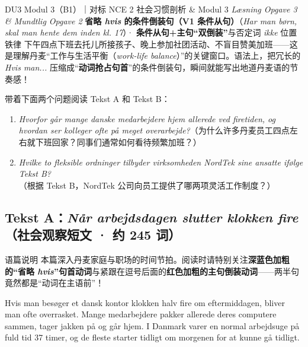 {DU3 Modul 3（B1）｜对标 NCE 2 社会习惯剖析 \& Modul 3 \textit{Læsning Opgave 3 \& Mundtlig Opgave 2}}
{\textbf{省略 \textit{hvis} 的条件倒装句（V1 条件从句）}（\textit{Har man børn, skal man hente dem inden kl. 17}）· \textbf{条件从句+主句“双倒装”}与否定词 \textit{ikke} 位置铁律}
{下午四点下班去托儿所接孩子、晚上参加社团活动、不盲目赞美加班——这是理解丹麦“工作与生活平衡（\textit{work-life balance}）”的关键窗口。语法上，把冗长的 \textit{Hvis man...} 压缩成“\textbf{动词抢占句首}”的条件倒装句，瞬间就能写出地道丹麦语的节奏感！}

\begin{foerduleaeser}
带着下面两个问题阅读 Tekst A 和 Tekst B：
\begin{enumerate}
  \item \textit{Hvorfor går mange danske medarbejdere hjem allerede ved firetiden, og hvordan ser kolleger ofte på meget overarbejde?}（为什么许多丹麦员工四点左右就下班回家？同事们通常如何看待频繁加班？）
  \item \textit{Hvilke to fleksible ordninger tilbyder virksomheden NordTek sine ansatte ifølge Tekst B?}（根据 Tekst B，NordTek 公司向员工提供了哪两项灵活工作制度？）
\end{enumerate}
\end{foerduleaeser}


\subsection*{Tekst A：\textit{Når arbejdsdagen slutter klokken fire}（社会观察短文 · 约 245 词）}

\begin{tipbox}{语篇说明}
本篇深入丹麦家庭与职场的时间节拍。阅读时请特别关注\textbf{\color{NCDNavy}深蓝色加粗的“省略 \textit{hvis}”句首动词}与紧跟在逗号后面的\textbf{\color{NCDRed}红色加粗的主句倒装动词}——两半句竟然都是“动词在主语前”！
\end{tipbox}

Hvis man besøger et dansk kontor klokken halv fire om eftermiddagen, bliver man ofte overrasket. Mange medarbejdere pakker allerede deres computere sammen, tager jakken på og går hjem. I Danmark varer en normal arbejdsuge på fuld tid 37 timer, og de fleste starter tidligt om morgenen for at kunne gå tidligt.

